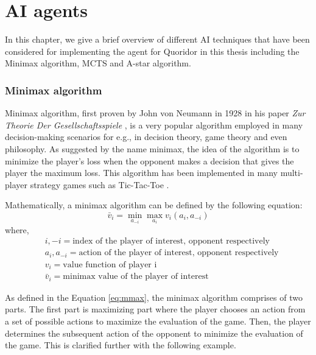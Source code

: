 \chapter{AI agents}
\label{background}

In this chapter, we give a brief overview of different \gls{AI} techniques that have been considered for implementing the agent for Quoridor in this thesis including the Minimax algorithm, \gls{MCTS} and A-star algorithm.

\subsection{Minimax algorithm} \label{sec:minimax}
Minimax algorithm, first proven by John von Neumann in 1928 in his paper \textit{Zur Theorie Der Gesellschaftsspiele} \citep{v1928theorie}, is a very popular algorithm employed in many decision-making scenarios for e.g., in decision theory, game theory and even philosophy. As suggested by the name minimax, the idea of the algorithm is to minimize the player's loss when the opponent makes a decision that gives the player the maximum loss. This algorithm has been implemented in many multi-player strategy games such as Tic-Tac-Toe \citep{savelli2008tic}. 


Mathematically, a minimax algorithm can be defined by the following equation:
\begin{equation}\label{eq:mmax}
    \bar{v}_i = \min_{a_{-i}} \max_{a_{i}} v_i (a_i, a_{-i})
\end{equation}
where,
\begin{subequations}
\begin{align}
    &i, -i = \text{index of the player of interest, opponent respectively} \\
    &a_i, a_{-i}= \text{action of the player of interest, opponent respectively} \\
    &v_i = \text{value function of player i} \\
    &\bar{v}_i = \text{minimax value of the player of interest}
\end{align}
\end{subequations}

As defined in the Equation \eqref{eq:mmax}, the minimax algorithm comprises of two parts. The first part is maximizing part where the player chooses an action from a set of possible actions to maximize the evaluation of the game. Then, the player determines the subsequent action of the opponent to minimize the evaluation of the game. This is clarified further with the following example.

